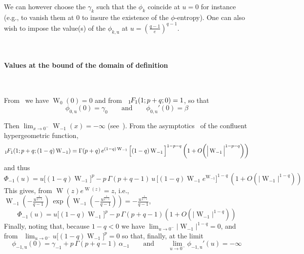 \documentclass[entropy,article,submit,moreauthors,pdftex]{Definitions/mdpi}
\def\W{\operatorname{W}} %
\newcommand{\hypgeom}[2]{\mbox{}_{#1}\hspace{-1pt}F_{#2}}%
\def\u{\mathrm{u}}
\begin{document}
We can however choose the $\gamma_k$ such  that the $\phi_k$ coincide at $u = 0$
for  instance (e.g.,  to vanish  them  at $0$  to  insure the  existence of  the
$\phi$-entropy). One can  also wish to impose the value(s)  of the $\phi_{k,\u}$
at $u = \left( \frac{q-1}{e} \right)^{q-1}$.

\

\paragraph{\bf Values at the bound of the domain of definition}

\

From~\cite[Eq.~3.1]{CorGon96}     we     have      $\W_0(0)     =     0$     and
from~\cite[Eq.~13.1.2]{AbrSte70} $\hypgeom{1}{1}(1 ; p+q ; 0) = 1$, so that
%
\begin{equation}
\phi_{0,\u}(0) = \gamma_0 \qquad \mbox{and} \qquad \phi_{0,\u}'(0) = \beta
\end{equation}

Then $\displaystyle \lim_{x \to 0^-} \W_{-1}(x) = - \infty$ (see~\cite[Fig.~1 or
  Eq.~4.18]{CorGon96}). From the  asymptotics~\cite[Eq.~13.1.4]{AbrSte70} of the
confluent hypergeometric function,
%
\[
\hypgeom{1}{1}\left( 1 ; p+q ; (1-q) \W_{-1}
\right) = \Gamma(p+q) \, e^{(1-q) \W_{-1}} \, \Big[ (1-q) \W_{-1} \Big]^{1-p-q} \,
\left(1+  O\left(  \Big| \W_{-1}  \Big|^{1-p-q}  \right) \right)
\]
%
and  thus
%
\[
\Phi_{-1}(u) = u \Big[ (1-q) \W_{-1} \Big]^p  - p \, \Gamma(p+q-1) \, u \, \Big[
  (1-q)  \W_{-1}  e^{\W_{-1}}  \Big]^{1-q}  \,   \left(1+  O\left(  \Big|  \W_{-1}
\Big|^{1-q} \right) \right)
\]
%
This   gives,   from   $\W(z)   e^{\W(z)}   =   z$,   i.e.,   $\W_{-1}\left(   -
\frac{u^{\frac{1}{q-1}}}{q-1}    \right)   \,    \exp\left(   \W_{-1}\left(    -
\frac{u^{\frac{1}{q-1}}}{q-1}         \right)         \right)        =         -
\frac{u^{\frac{1}{q-1}}}{q-1}$,
%
\[
\Phi_{-1}(u) = u \Big[ (1-q) \W_{-1}  \Big]^p - p \, \Gamma(p+q-1) \left(1+ O\left(
\Big| \W_{-1} \Big|^{1-q} \right) \right)
\]
%
Finally, noting that, because $1-q <  0$ we have $\displaystyle \lim_{u \to 0^-}
\Big|  \W_{-1}   \Big|^{1-q}  =  0$,   and  from~\cite[Eq.~4.6  \&   lines  that
  follow]{CorGon96}  $\displaystyle  \lim_{u  \to  0^-} u  \Big[  (1-q)  \W_{-1}
  \Big]^p = 0$ so that, finally, at the limit
%
\begin{equation}
\phi_{-1,\u}(0)  =  \gamma_{-1}  +  p \,  \Gamma(p+q-1)  \,  \alpha_{-1}  \qquad
\mbox{and} \qquad \lim_{u \to 0^-} \phi_{-1,\u}'(u) = -\infty
\end{equation}
%
\end{document}
